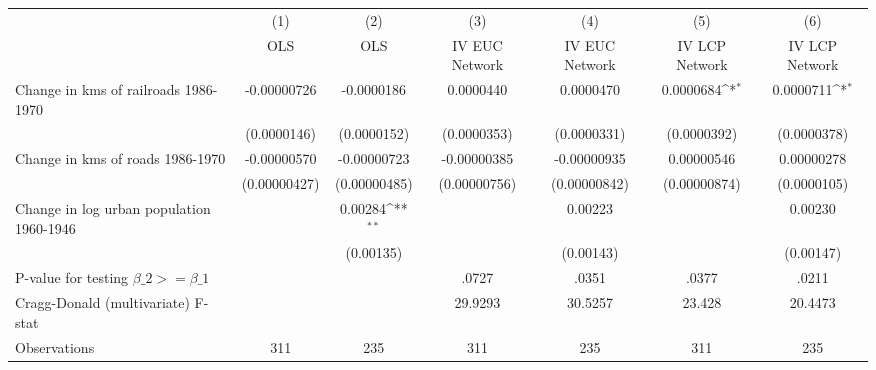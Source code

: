 {
\def\sym#1{\ifmmode^{#1}\else\(^{#1}\)\fi}
\begin{tabular}{l*{6}{c}}
\hline\hline
                &\multicolumn{1}{c}{(1)}&\multicolumn{1}{c}{(2)}&\multicolumn{1}{c}{(3)}&\multicolumn{1}{c}{(4)}&\multicolumn{1}{c}{(5)}&\multicolumn{1}{c}{(6)}\\
                &\multicolumn{1}{c}{OLS}&\multicolumn{1}{c}{OLS}&\multicolumn{1}{c}{IV EUC Network}&\multicolumn{1}{c}{IV EUC Network}&\multicolumn{1}{c}{IV LCP Network}&\multicolumn{1}{c}{IV LCP Network}\\
\hline
Change in kms of railroads 1986-1970&-0.00000726         &-0.0000186         &0.0000440         &0.0000470         &0.0000684\sym{*}  &0.0000711\sym{*}  \\
                &(0.0000146)         &(0.0000152)         &(0.0000353)         &(0.0000331)         &(0.0000392)         &(0.0000378)         \\
[1em]
Change in kms of roads 1986-1970&-0.00000570         &-0.00000723         &-0.00000385         &-0.00000935         &0.00000546         &0.00000278         \\
                &(0.00000427)         &(0.00000485)         &(0.00000756)         &(0.00000842)         &(0.00000874)         &(0.0000105)         \\
[1em]
Change in log urban population 1960-1946&                  &  0.00284\sym{**} &                  &  0.00223         &                  &  0.00230         \\
                &                  &(0.00135)         &                  &(0.00143)         &                  &(0.00147)         \\
\hline
P-value for testing $\beta\_{2} >= \beta\_{1}$&                  &                  &    .0727         &    .0351         &    .0377         &    .0211         \\
Cragg-Donald (multivariate) F-stat&                  &                  &  29.9293         &  30.5257         &   23.428         &  20.4473         \\
Observations    &      311         &      235         &      311         &      235         &      311         &      235         \\
\hline\hline
\end{tabular}
}
